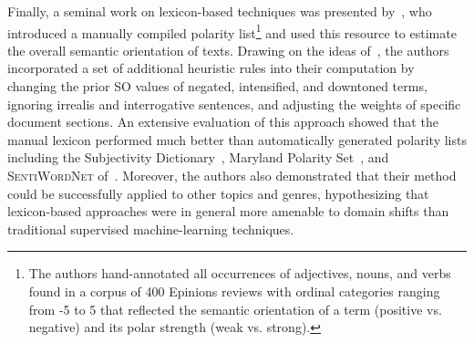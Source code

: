 Finally, a seminal work on lexicon-based techniques was presented
by~\citet{Taboada:11}, who introduced a manually compiled polarity
list\footnote{The authors hand-annotated all occurrences of
  adjectives, nouns, and verbs found in a corpus of 400 Epinions
  reviews with ordinal categories ranging from -5 to 5 that reflected
  the semantic orientation of a term (positive vs. negative) and its
  polar strength (weak vs. strong).} and used this resource to
estimate the overall semantic orientation of texts.  Drawing on the
ideas of~\citet{Polanyi:06}, the authors incorporated a set of
additional heuristic rules into their computation by changing the
prior SO values of negated, intensified, and downtoned terms, ignoring
irrealis and interrogative sentences, and adjusting the weights of
specific document sections.  An extensive evaluation of this approach
showed that the manual lexicon performed much better than
automatically generated polarity lists including the Subjectivity
Dictionary~\cite{Wilson:05}, Maryland Polarity Set~\cite{Mohammad:09},
and \textsc{SentiWordNet} of~\citet{Esuli:06c}.  Moreover, the authors
also demonstrated that their method could be successfully applied to
other topics and genres, hypothesizing that lexicon-based approaches
were in general more amenable to domain shifts than traditional
supervised machine-learning techniques.


